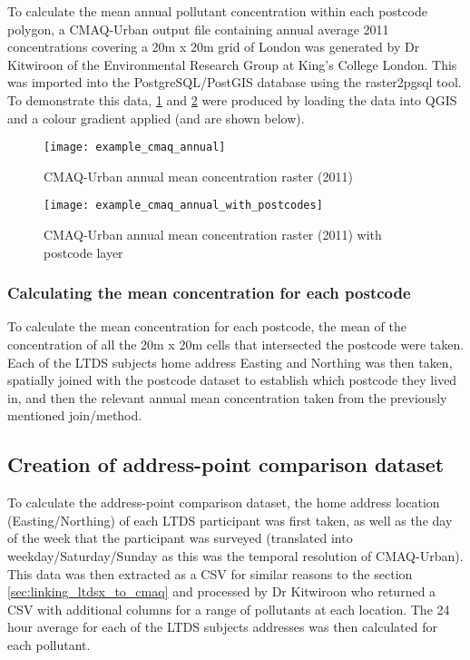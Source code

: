To calculate the mean annual pollutant concentration within each postcode polygon, a CMAQ-Urban output file containing annual average 2011 concentrations covering a 20m x 20m grid of London was generated by Dr Kitwiroon of the Environmental Research Group at King's College London. This was imported into the PostgreSQL/PostGIS database using the raster2pgsql tool. To demonstrate this data, \ref{fig:example_cmaq_annual} and \ref{fig:example_cmaq_annual_with_postcodes} were produced by loading the data into QGIS and a colour gradient applied (and are shown below).

\begin{figure}[H]
\centering
\texttt{[image: example\_cmaq\_annual]}
\caption{CMAQ-Urban annual mean concentration raster (2011)}
\label{fig:example_cmaq_annual}
\end{figure}

\begin{figure}[H]
\centering
\texttt{[image: example\_cmaq\_annual\_with\_postcodes]}
\caption{CMAQ-Urban annual mean concentration raster (2011) with postcode layer}
\label{fig:example_cmaq_annual_with_postcodes}
\end{figure}

        \subsubsection{Calculating the mean concentration for each postcode}
        \label{calculating_mean_postcode_data}

To calculate the mean concentration for each postcode, the mean of the concentration of all the 20m x 20m cells that intersected the postcode were taken. Each of the LTDS subjects home address Easting and Northing was then taken, spatially joined with the postcode dataset to establish which postcode they lived in, and then the relevant annual mean concentration taken from the previously mentioned join/method.

    \subsection{Creation of address-point comparison dataset}
    \label{sec:creating_address_point_dataset}

To calculate the address-point comparison dataset, the home address location (Easting/Northing) of each LTDS participant was first taken, as well as the day of the week that the participant was surveyed (translated into weekday/Saturday/Sunday as this was the temporal resolution of CMAQ-Urban). This data was then extracted as a CSV for similar reasons to the section \ref{sec:linking_ltdsx_to_cmaq} and processed by Dr Kitwiroon who returned a CSV with additional columns for a range of pollutants at each location. The 24 hour average for each of the LTDS subjects addresses was then calculated for each pollutant.

